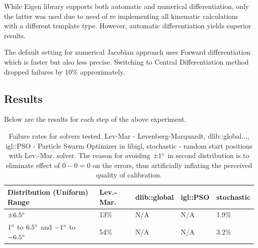 \documentclass[english, printversion, nomenclature, notitle]{tuvisionthesis} %
\begin{document}
While Eigen library supports both automatic and numerical differentiation, only the latter was used due to need of re implementing all kinematic calculations with a different template type. However, automatic differentiation yields superior results.

The default setting for numerical Jacobian approach uses Forward differentiation which is faster but also less precise. Switching to Central Differentiation method dropped failures by 10\% approximately.

\subsection{Results}

Below are the results for each step of the above experiment.  

\begin{table}[]
	\begin{tabular}{|l|l|l|l|l|}
		\hline
		Distribution (Uniform) Range & Lev.-Mar.  & dlib::global & igl::PSO & stochastic \\
		\hline
		$\pm6.5\degree$& 13\% & N/A  & N/A & 1.9\% \\
		$1\degree$ to $6.5\degree$ and $-1\degree$ to $-6.5\degree$	& 54\% & N/A & N/A &3.2\% \\ \hline
		
	\end{tabular}
	\caption{Failure rates for solvers tested. Lev-Mar - Levenberg-Marquardt, dlib::global..., igl::PSO - Particle Swarm Optimizer in libigl, stochastic - random start positions with Lev.-Mar. solver. The reason for avoiding $\pm1\degree$ in second distribution is to eliminate effect of $0 - 0 = 0$ on the errors, thus artificially inflating the perceived quality of calibration.}
\end{table}

\begin{center}
	\noindent{}
\end{center}
\end{document}
